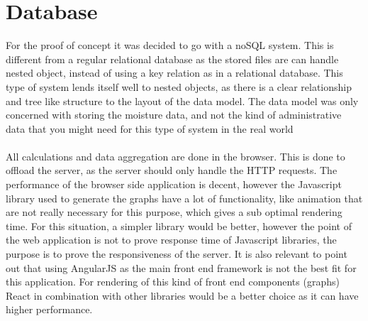 \documentclass[]{uiophd}
\begin{document}
\section{Database}
For the proof of concept it was decided to go with a noSQL system. This is different from a regular relational database as the stored files are can handle nested object, instead of using a key relation as in a relational database. This type of system lends itself well to nested objects, as there is a clear relationship and tree like structure to the layout of the data model. The data model was only concerned with storing the moisture data, and not the kind of administrative data that you might need for this type of system in the real world
\\\\
All calculations and data aggregation are done in the browser. This is done to offload the server, as the server should only handle the HTTP requests. The performance of the browser side application is decent, however the Javascript library used to generate the graphs have a lot of functionality, like animation that are not really necessary for this purpose, which gives a sub optimal rendering time. For this situation, a simpler library would be better, however the point of the web application is not to prove response time of Javascript libraries, the purpose is to prove the responsiveness of the server. It is also relevant to point out that using AngularJS as the main front end framework is not the best fit for this application. For rendering of this kind of front end components (graphs) React in combination with other libraries would be a better choice as it can have higher performance. 
\end{document}
